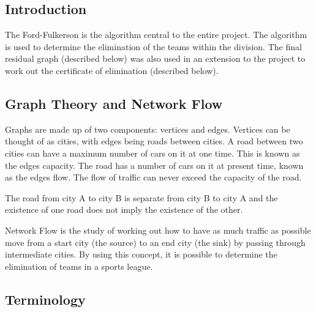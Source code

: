 \subsection{Introduction}

The Ford-Fulkerson is the algorithm central to the entire project. The
algorithm is used to determine the elimination of the teams within the
division. The final residual graph (described below) was also used in an
extension to the project to work out the certificate of elimination
(described below).

\subsection{Graph Theory and Network Flow}
\label{sec:graphTheoryAndNetworkFlow}

Graphs are made up of two components: vertices and edges. Vertices can be
thought of as cities, with edges being roads between cities. A road between
two cities can have a maximum number of cars on it at one time. This is
known as the edges capacity. The road has a number of cars on it at present
time, known as the edges flow. The flow of traffic can never exceed the
capacity of the road.

The road from city A to city B is separate from city B to city A and the
existence of one road does not imply the existence of the other.

Network Flow is the study of working out how to have as much traffic as possible
move from a start city (the source) to an end city (the sink) by passing through
intermediate cities. By using this concept, it is possible to determine
the elimination of teams in a sports league.

\subsection{Terminology}

